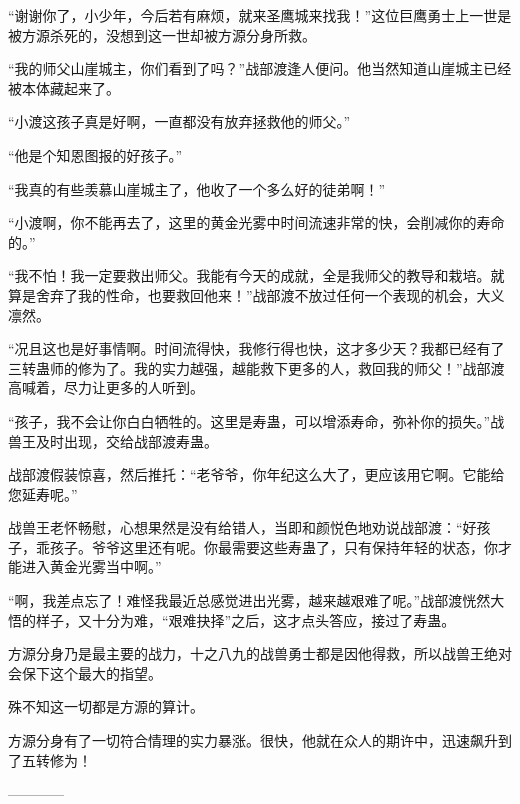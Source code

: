 \begin{this_body}
“谢谢你了，小少年，今后若有麻烦，就来圣鹰城来找我！”这位巨鹰勇士上一世是被方源杀死的，没想到这一世却被方源分身所救。

“我的师父山崖城主，你们看到了吗？”战部渡逢人便问。他当然知道山崖城主已经被本体藏起来了。

“小渡这孩子真是好啊，一直都没有放弃拯救他的师父。”

“他是个知恩图报的好孩子。”

“我真的有些羡慕山崖城主了，他收了一个多么好的徒弟啊！”

“小渡啊，你不能再去了，这里的黄金光雾中时间流速非常的快，会削减你的寿命的。”

“我不怕！我一定要救出师父。我能有今天的成就，全是我师父的教导和栽培。就算是舍弃了我的性命，也要救回他来！”战部渡不放过任何一个表现的机会，大义凛然。

“况且这也是好事情啊。时间流得快，我修行得也快，这才多少天？我都已经有了三转蛊师的修为了。我的实力越强，越能救下更多的人，救回我的师父！”战部渡高喊着，尽力让更多的人听到。

“孩子，我不会让你白白牺牲的。这里是寿蛊，可以增添寿命，弥补你的损失。”战兽王及时出现，交给战部渡寿蛊。

战部渡假装惊喜，然后推托：“老爷爷，你年纪这么大了，更应该用它啊。它能给您延寿呢。”

战兽王老怀畅慰，心想果然是没有给错人，当即和颜悦色地劝说战部渡：“好孩子，乖孩子。爷爷这里还有呢。你最需要这些寿蛊了，只有保持年轻的状态，你才能进入黄金光雾当中啊。”

“啊，我差点忘了！难怪我最近总感觉进出光雾，越来越艰难了呢。”战部渡恍然大悟的样子，又十分为难，“艰难抉择”之后，这才点头答应，接过了寿蛊。

方源分身乃是最主要的战力，十之八九的战兽勇士都是因他得救，所以战兽王绝对会保下这个最大的指望。

殊不知这一切都是方源的算计。

方源分身有了一切符合情理的实力暴涨。很快，他就在众人的期许中，迅速飙升到了五转修为！

------------

\end{this_body}


